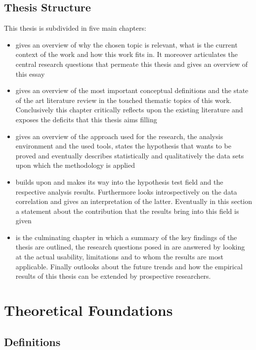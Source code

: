 \documentclass{seal_thesis}
\begin{document}
\section{Thesis Structure}

This thesis is subdivided in five main chapters:

\begin{itemize}
	\item {} gives an overview of why the chosen topic is relevant, what is the current context of the work and how this work fits in. It moreover articulates the central research questions that permeate this thesis and gives an overview of this essay
	\item {} gives an overview of the most important conceptual definitions and the state of the art literature review in the touched thematic topics of this work. Conclusively this chapter critically reflects upon the existing literature and exposes the deficits that this thesis aims filling
	\item {} gives an overview of the approach used for the research, \eg the analysis environment and the used tools, states the hypothesis that wants to be proved and eventually describes statistically and qualitatively the data sets upon which the methodology is applied
	\item {} builds upon  and makes its way into the hypothesis test field and the respective analysis results. Furthermore looks introspectively on the data correlation and gives an interpretation of the latter. Eventually in this section a statement about the contribution that the results bring into this field is given
	\item {} is the culminating chapter in which a summary of the key findings of the thesis are outlined, the research questions posed in  are answered by looking at the actual usability, limitations and to whom the results are most applicable. Finally outlooks about the future trends and how the empirical results of this thesis can be extended by prospective researchers.
\end{itemize}

\chapter{Theoretical Foundations}
\label{ch:foundations}

\section{Definitions}
\end{document}
